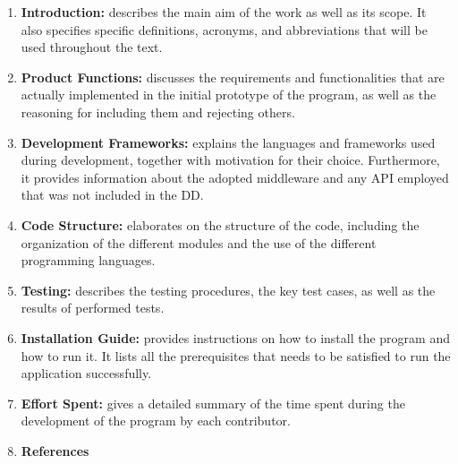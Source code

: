 \begin{enumerate}
    \item \textbf{Introduction:} describes the main aim of the work as well as its scope. It also specifies specific definitions, acronyms, and abbreviations that will be used throughout the text.
    \item \textbf{Product Functions:} discusses the requirements and functionalities that are actually implemented in the initial prototype of the program, as well as the reasoning for including them and rejecting others.
    \item \textbf{Development Frameworks:} explains the languages and frameworks used during development, together with motivation for their choice. Furthermore, it provides information about the adopted middleware and any API employed that was not included in the DD.
    \item \textbf{Code Structure:} elaborates on the structure of the code, including the organization of the different modules and the use of the different programming languages.
    \item \textbf{Testing:} describes the testing procedures, the key test cases, as well as the results of performed tests.
    \item \textbf{Installation Guide:} provides instructions on how to install the program and how to run it. It lists all the prerequisites that needs to be satisfied to run the application successfully.
    \item \textbf{Effort Spent:} gives a detailed summary of the time spent during the development of the program by each contributor.
    \item \textbf{References}
\end{enumerate}
